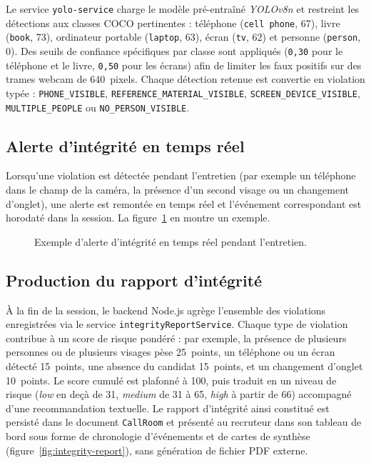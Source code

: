 Le service \texttt{yolo-service} charge le modèle pré-entraîné \textit{YOLOv8n} et restreint
les détections aux classes COCO pertinentes : téléphone (\texttt{cell phone}, 67), livre
(\texttt{book}, 73), ordinateur portable (\texttt{laptop}, 63), écran (\texttt{tv}, 62) et
personne (\texttt{person}, 0). Des seuils de confiance spécifiques par classe sont appliqués
(\texttt{0{,}30} pour le téléphone et le livre, \texttt{0{,}50} pour les écrans) afin de
limiter les faux positifs sur des trames webcam de 640~pixels. Chaque détection retenue est
convertie en violation typée : \texttt{PHONE\_VISIBLE}, \texttt{REFERENCE\_MATERIAL\_VISIBLE},
\texttt{SCREEN\_DEVICE\_VISIBLE}, \texttt{MULTIPLE\_PEOPLE} ou \texttt{NO\_PERSON\_VISIBLE}.

\subsection{Alerte d'intégrité en temps réel}

Lorsqu'une violation est détectée pendant l'entretien (par exemple un téléphone dans le champ de la caméra, la présence d'un second visage ou un changement d'onglet), une alerte est remontée en temps réel et l'événement correspondant est horodaté dans la session. La figure~\ref{fig:integrity-alert} en montre un exemple.

\begin{figure}[H]
  \centering
  \caption{Exemple d'alerte d'intégrité en temps réel pendant l'entretien.}
  \label{fig:integrity-alert}
\end{figure}

\subsection{Production du rapport d'intégrité}

À la fin de la session, le backend Node.js agrège l'ensemble des violations enregistrées via
le service \texttt{integrityReportService}. Chaque type de violation contribue à un score de
risque pondéré : par exemple, la présence de plusieurs personnes ou de plusieurs visages
pèse 25~points, un téléphone ou un écran détecté 15~points, une absence du candidat 15~points,
et un changement d'onglet 10~points. Le score cumulé est plafonné à 100, puis traduit en un
niveau de risque (\textit{low} en deçà de 31, \textit{medium} de 31 à 65, \textit{high} à
partir de 66) accompagné d'une recommandation textuelle. Le rapport d'intégrité ainsi constitué est
persisté dans le document \texttt{CallRoom} et présenté au recruteur dans son tableau de bord
sous forme de chronologie d'événements et de cartes de synthèse (figure~\ref{fig:integrity-report}),
sans génération de fichier PDF externe.

